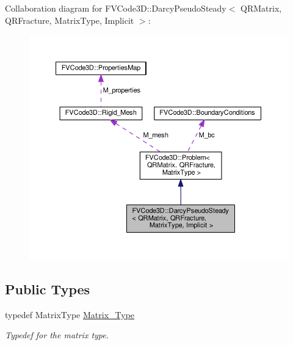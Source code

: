 Collaboration diagram for F\+V\+Code3D\+:\+:Darcy\+Pseudo\+Steady$<$ Q\+R\+Matrix, Q\+R\+Fracture, Matrix\+Type, Implicit $>$\+:
\nopagebreak
\begin{figure}[H]
\begin{center}
\leavevmode
\includegraphics[width=350pt]{classFVCode3D_1_1DarcyPseudoSteady_3_01QRMatrix_00_01QRFracture_00_01MatrixType_00_01Implicit_01_4__coll__graph}
\end{center}
\end{figure}
\subsection*{Public Types}
\begin{DoxyCompactItemize}
\item 
typedef Matrix\+Type \hyperlink{classFVCode3D_1_1DarcyPseudoSteady_3_01QRMatrix_00_01QRFracture_00_01MatrixType_00_01Implicit_01_4_a0c4c09b192d518545409c84da0ba6f16}{Matrix\+\_\+\+Type}
\begin{DoxyCompactList}\small\item\em Typedef for the matrix type. \end{DoxyCompactList}\end{DoxyCompactItemize}
